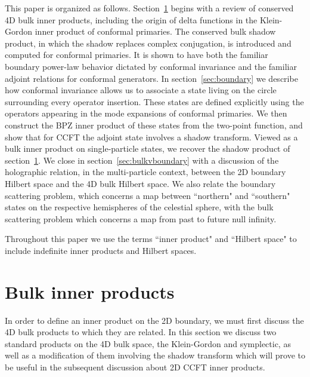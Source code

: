 \documentclass[11pt]{article}
\numberwithin{equation}{section}
\begin{document}
This paper is organized as follows. Section~\ref{sec:bulkinner} begins with a review of conserved 4D bulk inner products, including the origin of delta functions in the Klein-Gordon inner product of conformal primaries.  The conserved bulk shadow  product, in which the shadow replaces complex conjugation, is introduced and computed for conformal primaries. It is shown to have both the familiar boundary power-law behavior dictated by conformal invariance and the familiar  adjoint relations for conformal generators. In section~\ref{sec:boundary} we describe how conformal invariance allows us to associate a state living on the circle surrounding every operator insertion. These states are defined explicitly using the operators appearing in the mode expansions of conformal primaries. We then construct the BPZ  inner product of these states from the two-point function, and show that for CCFT the adjoint state involves a shadow transform.  Viewed as a bulk inner product on single-particle states, we recover the shadow product of section~\ref{sec:bulkinner}.  We close in section~\ref{sec:bulkvboundary} with a discussion of  the holographic relation, in the multi-particle context, between the 2D boundary Hilbert space and the 4D bulk Hilbert space. We also relate  the boundary scattering problem, which concerns a map between ``northern" and ``southern" states on the respective hemispheres of the celestial sphere, with the bulk scattering problem which concerns a map from past to future null infinity. 
  
Throughout this paper we use the terms ``inner product" and ``Hilbert space" to include indefinite inner products and Hilbert spaces. 

  
  
\section{Bulk  inner products}\label{sec:bulkinner}
In order to define an inner product on the 2D boundary, we must first discuss the 4D bulk products to which they are related. In this section we discuss two standard products on the 4D bulk space, the Klein-Gordon and symplectic, as well as a modification of them involving the shadow transform which will prove to be useful in the subsequent discussion about 2D CCFT inner products.
\end{document}
